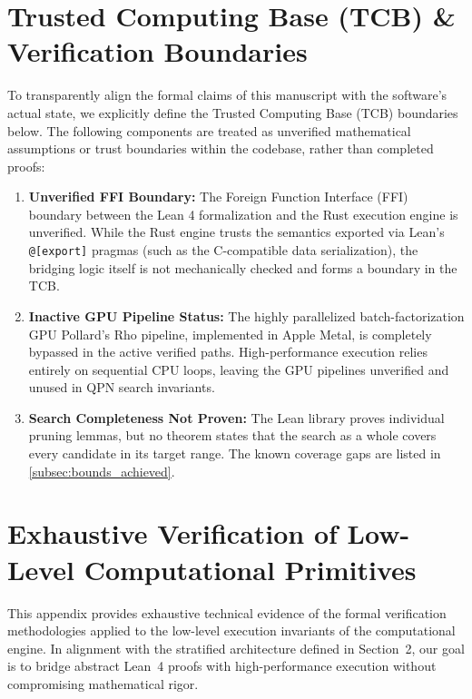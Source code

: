 \appendix
\section{Trusted Computing Base (TCB) \& Verification Boundaries}
\label{app:tcb}

To transparently align the formal claims of this manuscript with the software's actual state, we explicitly define the Trusted Computing Base (TCB) boundaries below. The following components are treated as unverified mathematical assumptions or trust boundaries within the codebase, rather than completed proofs:

\begin{enumerate}
    \item \textbf{Unverified FFI Boundary:} The Foreign Function Interface (FFI) boundary between the Lean 4 formalization and the Rust execution engine is unverified. While the Rust engine trusts the semantics exported via Lean's \texttt{@[export]} pragmas (such as the C-compatible data serialization), the bridging logic itself is not mechanically checked and forms a boundary in the TCB.
    
    \item \textbf{Inactive GPU Pipeline Status:} The highly parallelized batch-factorization GPU Pollard's Rho pipeline, implemented in Apple Metal, is completely bypassed in the active verified paths. High-performance execution relies entirely on sequential CPU loops, leaving the GPU pipelines unverified and unused in QPN search invariants.

    \item \textbf{Search Completeness Not Proven:} The Lean library proves individual pruning lemmas, but no theorem states that the search as a whole covers every candidate in its target range. The known coverage gaps are listed in \cref{subsec:bounds_achieved}.
\end{enumerate}

\section{Exhaustive Verification of Low-Level Computational Primitives}
\label{app:verification}

This appendix provides exhaustive technical evidence of the formal verification methodologies applied to the low-level execution invariants of the computational engine. In alignment with the stratified architecture defined in Section~2, our goal is to bridge abstract Lean~4 proofs with high-performance execution without compromising mathematical rigor.

